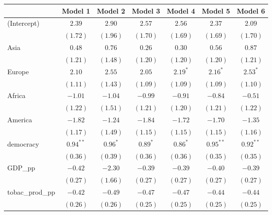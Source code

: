 
\begin{table}[!h]
\begin{center}
\begin{tabular}{l c c c c c c }
\toprule
 & Model 1 & Model 2 & Model 3 & Model 4 & Model 5 & Model 6 \\
\midrule
(Intercept)             & $2.39$      & $2.90$     & $2.57$      & $2.56$      & $2.37$      & $2.09$      \\
                        & $(1.72)$    & $(1.96)$   & $(1.70)$    & $(1.69)$    & $(1.69)$    & $(1.70)$    \\
Asia                    & $0.48$      & $0.76$     & $0.26$      & $0.30$      & $0.56$      & $0.87$      \\
                        & $(1.21)$    & $(1.48)$   & $(1.20)$    & $(1.20)$    & $(1.20)$    & $(1.21)$    \\
Europe                  & $2.10$      & $2.55$     & $2.05$      & $2.19^{*}$  & $2.16^{*}$  & $2.53^{*}$  \\
                        & $(1.11)$    & $(1.43)$   & $(1.09)$    & $(1.09)$    & $(1.09)$    & $(1.10)$    \\
Africa                  & $-1.01$     & $-1.04$    & $-0.99$     & $-0.91$     & $-0.84$     & $-0.51$     \\
                        & $(1.22)$    & $(1.51)$   & $(1.21)$    & $(1.20)$    & $(1.21)$    & $(1.22)$    \\
America                 & $-1.82$     & $-1.24$    & $-1.84$     & $-1.72$     & $-1.70$     & $-1.35$     \\
                        & $(1.17)$    & $(1.49)$   & $(1.15)$    & $(1.15)$    & $(1.15)$    & $(1.16)$    \\
democracy               & $0.94^{**}$ & $0.96^{*}$ & $0.89^{*}$  & $0.86^{*}$  & $0.95^{**}$ & $0.92^{**}$ \\
                        & $(0.36)$    & $(0.39)$   & $(0.36)$    & $(0.36)$    & $(0.35)$    & $(0.35)$    \\
GDP\_pp                 & $-0.42$     & $-2.30$    & $-0.39$     & $-0.39$     & $-0.40$     & $-0.39$     \\
                        & $(0.27)$    & $(1.66)$   & $(0.27)$    & $(0.27)$    & $(0.27)$    & $(0.27)$    \\
tobac\_prod\_pp         & $-0.42$     & $-0.49$    & $-0.47$     & $-0.47$     & $-0.44$     & $-0.44$     \\
                        & $(0.26)$    & $(0.26)$   & $(0.25)$    & $(0.25)$    & $(0.25)$    & $(0.25)$    \\

\end{tabular}
\end{center}
\end{table}
